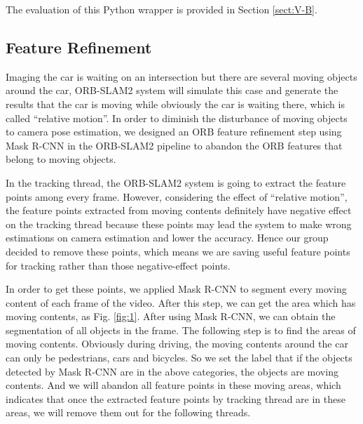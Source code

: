 \documentclass[letterpaper, 10 pt, conference]{IEEEtran}
\begin{document}
The evaluation of this Python wrapper is provided in Section \ref{sect:V-B}. 

\subsection{Feature Refinement} \label{sect:\thesubsection}
Imaging the car is waiting on an intersection but there are several moving
objects around the car, ORB-SLAM2 system will simulate this case and generate
the results that the car is moving while obviously the car is waiting there,
which is called ``relative motion''. In order to diminish the disturbance of
moving objects to camera pose estimation, we designed an ORB feature refinement
step using Mask R-CNN in the ORB-SLAM2 pipeline to abandon the ORB features
that belong to moving objects. 

In the tracking thread, the ORB-SLAM2 system is going to extract the feature
points among every frame. However, considering the effect of ``relative 
motion'', the feature points extracted from moving contents definitely have
negative effect on the tracking thread because these points may lead the system
to make wrong estimations on camera estimation and lower the accuracy. Hence our
group decided to remove these points, which means we are saving useful feature
points for tracking rather than those negative-effect points. 

In order to get these points, we applied Mask R-CNN to segment every moving
content of each frame of the video. After this step, we can get the area which
has moving contents, as Fig. \ref{fig:1}. After using Mask R-CNN, we can obtain
the segmentation of all objects in the frame. The following step is to find the
areas of moving contents. Obviously during driving, the moving contents around
the car can only be pedestrians, cars and bicycles. So we set the label that if
the objects detected by Mask R-CNN are in the above categories, the objects are
moving contents. And we will abandon all feature points in these moving areas,
which indicates that once the extracted feature points by tracking thread are
in these areas, we will remove them out for the following threads. 
\end{document}
